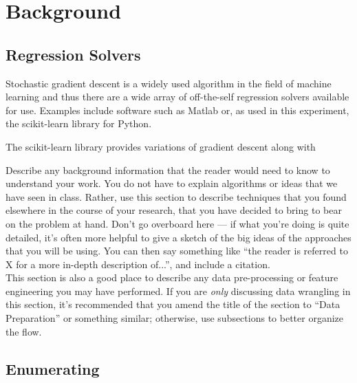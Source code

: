 
\section{Background}
\label{sec:background}


\subsection{Regression Solvers}

Stochastic gradient descent is a widely used algorithm in the field of machine
learning and thus there are a wide array of off-the-self regression solvers
available for use. Examples include software such as Matlab or, as used in
this experiment, the scikit-learn library for Python.

The scikit-learn library provides variations of gradient descent along with  

Describe any background information that the reader would need to know
to understand your work. You do not have to explain algorithms or
ideas that we have seen in class. Rather, use this section to describe
techniques that you found elsewhere in the course of your research,
that you have decided to bring to bear on the problem at hand. Don't
go overboard here --- if what you're doing is quite detailed, it's
often more helpful to give a sketch of the big ideas of the approaches
that you will be using. You can then say something like ``the reader
is referred to X for a more in-depth description of...'', and include
a citation.\\

This section is also a good place to describe any data pre-processing
or feature engineering you may have performed. If you are \emph{only}
discussing data wrangling in this section, it's recommended that you
amend the title of the section to ``Data Preparation'' or something
similar; otherwise, use subsections to better organize the flow.

\subsection{Enumerating}
\label{subsec:enum}

